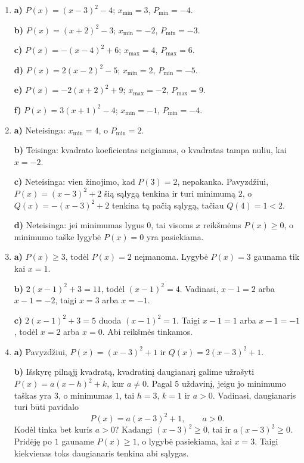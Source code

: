 \documentclass[12pt,a4paper]{article}
\begin{document}
\begin{enumerate}
\textbf{f)} Kadangi $-3(x-1)^2\le0$, tai $P(x)=4-3(x-1)^2\le4$. $x_{\max}=1$, $P_{\max}=4$.

\textbf{g)} Kadangi $\frac{1}{2}(x+1)^2\ge0$, tai $P(x)=\frac{1}{2}(x+1)^2+3\ge3$. $x_{\min}=-1$, $P_{\min}=3$.

\textbf{h)} Kadangi $-(x-2)^2\le0$, tai $P(x)=-(x-2)^2\le0$. $x_{\max}=2$, $P_{\max}=0$.
\item \textbf{a)} $P(x)=(x-3)^2-4$; $x_{\min}=3$, $P_{\min}=-4$.

\textbf{b)} $P(x)=(x+2)^2-3$; $x_{\min}=-2$, $P_{\min}=-3$.

\textbf{c)} $P(x)=-(x-4)^2+6$; $x_{\max}=4$, $P_{\max}=6$.

\textbf{d)} $P(x)=2(x-2)^2-5$; $x_{\min}=2$, $P_{\min}=-5$.

\textbf{e)} $P(x)=-2(x+2)^2+9$; $x_{\max}=-2$, $P_{\max}=9$.

\textbf{f)} $P(x)=3(x+1)^2-4$; $x_{\min}=-1$, $P_{\min}=-4$.
\item \textbf{a)} Neteisinga: $x_{\min}=4$, o $P_{\min}=2$.

\textbf{b)} Teisinga: kvadrato koeficientas neigiamas, o kvadratas tampa nuliu, kai $x=-2$.

\textbf{c)} Neteisinga: vien žinojimo, kad $P(3)=2$, nepakanka. Pavyzdžiui, $P(x)=(x-3)^2+2$ šią sąlygą tenkina ir turi minimumą $2$, o $Q(x)=-(x-3)^2+2$ tenkina tą pačią sąlygą, tačiau $Q(4)=1<2$.

\textbf{d)} Neteisinga: jei minimumas lygus $0$, tai visoms $x$ reikšmėms $P(x)\ge0$, o minimumo taške lygybė $P(x)=0$ yra pasiekiama.
\item \textbf{a)} $P(x)\ge3$, todėl $P(x)=2$ neįmanoma. Lygybė $P(x)=3$ gaunama tik kai $x=1$.

\textbf{b)} $2(x-1)^2+3=11$, todėl $(x-1)^2=4$. Vadinasi, $x-1=2$ arba $x-1=-2$, taigi $x=3$ arba $x=-1$.

\textbf{c)} $2(x-1)^2+3=5$ duoda $(x-1)^2=1$. Taigi $x-1=1$ arba $x-1=-1$, todėl $x=2$ arba $x=0$. Abi reikšmės tinkamos.
\item \textbf{a)} Pavyzdžiui, $P(x)=(x-3)^2+1$ ir $Q(x)=2(x-3)^2+1$.

\textbf{b)} Išskyrę pilnąjį kvadratą, kvadratinį daugianarį galime užrašyti $P(x)=a(x-h)^2+k$, kur $a\ne0$. Pagal 5 uždavinį, jeigu jo minimumo taškas yra $3$, o minimumas $1$, tai $h=3$, $k=1$ ir $a>0$. Vadinasi, daugianaris turi būti pavidalo
\[
P(x)=a(x-3)^2+1,\qquad a>0.
\]
Kodėl tinka bet kuris $a>0$? Kadangi $(x-3)^2\ge0$, tai ir $a(x-3)^2\ge0$. Pridėję po $1$ gauname $P(x)\ge1$, o lygybė pasiekiama, kai $x=3$. Taigi kiekvienas toks daugianaris tenkina abi sąlygas.


\end{enumerate}
\end{document}
